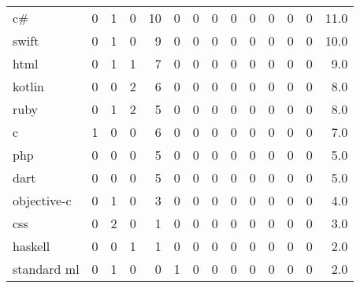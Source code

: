 \begin{tabular}{lrrrrrrrrrrrrr}
c\#               &        0 &       1 &          0 &              10 &                0 &       0 &          0 &         0 &         0 &      0 &             0 &         0 &     11.0 \\
swift            &        0 &       1 &          0 &               9 &                0 &       0 &          0 &         0 &         0 &      0 &             0 &         0 &     10.0 \\
html             &        0 &       1 &          1 &               7 &                0 &       0 &          0 &         0 &         0 &      0 &             0 &         0 &      9.0 \\
kotlin           &        0 &       0 &          2 &               6 &                0 &       0 &          0 &         0 &         0 &      0 &             0 &         0 &      8.0 \\
ruby             &        0 &       1 &          2 &               5 &                0 &       0 &          0 &         0 &         0 &      0 &             0 &         0 &      8.0 \\
c                &        1 &       0 &          0 &               6 &                0 &       0 &          0 &         0 &         0 &      0 &             0 &         0 &      7.0 \\
php              &        0 &       0 &          0 &               5 &                0 &       0 &          0 &         0 &         0 &      0 &             0 &         0 &      5.0 \\
dart             &        0 &       0 &          0 &               5 &                0 &       0 &          0 &         0 &         0 &      0 &             0 &         0 &      5.0 \\
objective-c      &        0 &       1 &          0 &               3 &                0 &       0 &          0 &         0 &         0 &      0 &             0 &         0 &      4.0 \\
css              &        0 &       2 &          0 &               1 &                0 &       0 &          0 &         0 &         0 &      0 &             0 &         0 &      3.0 \\
haskell          &        0 &       0 &          1 &               1 &                0 &       0 &          0 &         0 &         0 &      0 &             0 &         0 &      2.0 \\
standard ml      &        0 &       1 &          0 &               0 &                1 &       0 &          0 &         0 &         0 &      0 &             0 &         0 &      2.0 \\

\end{tabular}
